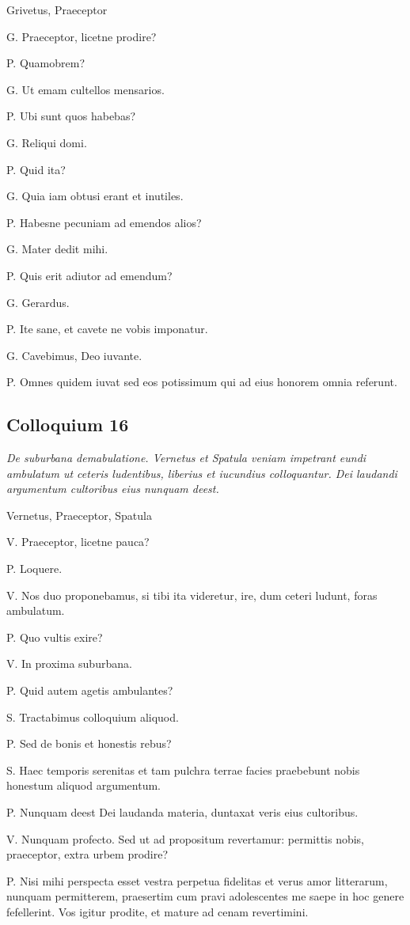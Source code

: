 \documentclass{article}
\begin{document}
Grivetus, Praeceptor

G. Praeceptor, licetne prodire?

P. Quamobrem?

G. Ut emam cultellos mensarios.

P. Ubi sunt quos habebas?

G. Reliqui domi.

P. Quid ita?

G. Quia iam obtusi erant et inutiles.

P. Habesne pecuniam ad emendos alios?

G. Mater dedit mihi.

P. Quis erit adiutor ad emendum?

G. Gerardus.

P. Ite sane, et cavete ne vobis imponatur.

G. Cavebimus, Deo iuvante.

P. Omnes quidem iuvat sed eos potissimum qui ad eius honorem omnia referunt.

\subsection{Colloquium 16}
\emph{De suburbana demabulatione. Vernetus et Spatula veniam impetrant eundi ambulatum ut ceteris ludentibus, liberius et iucundius colloquantur. Dei laudandi argumentum cultoribus eius nunquam deest.}

Vernetus, Praeceptor, Spatula

V. Praeceptor, licetne pauca?

P. Loquere.

V. Nos duo proponebamus, si tibi ita videretur, ire, dum ceteri ludunt, foras ambulatum.

P. Quo vultis exire?

V. In proxima suburbana.

P. Quid autem agetis ambulantes?

S. Tractabimus colloquium aliquod.

P. Sed de bonis et honestis rebus?

S. Haec temporis serenitas et tam pulchra terrae facies praebebunt nobis honestum aliquod argumentum.

P. Nunquam deest Dei laudanda materia, duntaxat veris eius cultoribus.

V. Nunquam profecto. Sed ut ad propositum revertamur: permittis nobis, praeceptor, extra urbem prodire?

P. Nisi mihi perspecta esset vestra perpetua fidelitas et verus amor litterarum, nunquam permitterem, praesertim cum pravi adolescentes me saepe in hoc genere fefellerint. Vos igitur prodite, et mature ad cenam revertimini.
\end{document}
